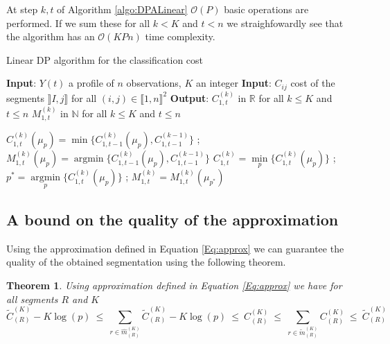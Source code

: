 \documentclass[11pt]{llncs}
\newtheorem{theo}{Theorem}[section]    %
\begin{document}
At step $k, t$ of Algorithm \ref{algo:DPALinear}  $\mathcal{O}(P)$ basic operations are performed. If we sum these for all $k < K$ and $t < n$  we straighfowardly see that the algorithm has an $\mathcal{O}(KPn)$ time complexity.
\begin{algorithm}
\begin{algorithmic}
\caption{Linear DP algorithm for the classification cost}\label{algo:DPALinear}
    \State \textbf{Input}: $Y(t)$ a profile of $n$ observations, $K$ an integer 
 \State \textbf{Input}: $C_{ij}$ cost of the segments $\rrbracket I, j \rrbracket$  for all $(i, j) \in \llbracket1, n \rrbracket^2$
   \State \textbf{Output}: $C^{(k)}_{1,t}$ in $\mathbb{R}$ for all $k \leq K$ and $t \leq n$ 
    \State $M^{(k)}_{1,t}$ in $\mathbb{N}$ for all $k \leq K$ and $t \leq n$ 

           \State $C^{(k)}_{1,t}(\mu_p) = \min \{ C^{(k)}_{1,t-1}(\mu_p), C^{(k-1)}_{1,t-1} \}$ ; 
           \State $M^{(k)}_{1,t}(\mu_p) = \operatorname{argmin} \{C^{(k)}_{1,t-1}(\mu_p), C^{(k-1)}_{1,t-1} \}$ 
          \EndFor        
           \State $C^{(k)}_{1,t} = \underset{p}{\min} \{ C^{(k)}_{1,t}(\mu_p) \}$ ; $p^* = \underset{p}{\operatorname{argmin}} \{ C^{(k)}_{1,t}(\mu_p) \}$ ; $M^{(k)}_{1,t} = M^{(k)}_{1,t}( \mu_{{p^*}}) $ 
         \EndFor
    \EndFor
  \end{algorithmic}
\end{algorithm}

\subsection{A bound on the quality of the approximation }
Using the approximation defined in Equation \ref{Eq:approx} we can guarantee the quality of the obtained segmentation using the following theorem.
\begin{theo}
Using approximation defined in Equation \ref{Eq:approx} we have for all segments $R$ and $K$
$$ \widetilde{C}_{(R)}^{(K)} - K \log(p) 
\ \leq \ 
\underset{r \in \widehat{m}_{(R)}^{(K)}}{\operatorname{\sum}} \widetilde{C}_{(R)}^{(K)} - K \log(p) 
\ \leq \ 
{C}_{(R)}^{(K)} 
\ \leq \ 
\underset{r \in \widetilde{m}_{(R)}^{(K)}}{\operatorname{\sum}} {C}_{(R)}^{(K)} 
\ \leq \ 
\widetilde{C}_{(R)}^{(K)} $$
\label{theo:theoapprox}
\end{theo}
\end{document}
